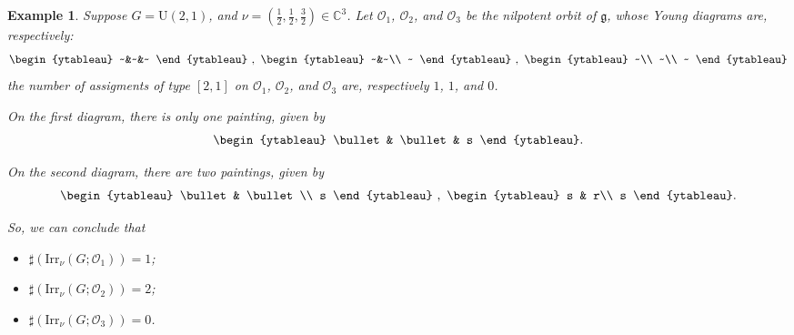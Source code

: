 \documentclass[12pt, a4paper]{amsart}
\numberwithin{equation}{section}
\newtheorem{examp}[thm]{Example}
\newcommand{\BC}{{\mathbb {C}}}
\newcommand{\CO}{{\mathcal {O}}}
\newcommand{\fg}{\mathfrak{g}}
\newcommand{\U}{{\mathrm{U}}}
\newcommand{\Irr}{{\mathrm{Irr}}}
\begin{document}
\begin{examp}
    Suppose $G = \U(2,1)$, and $\nu = (\frac{1}{2},\frac{1}{2},\frac{3}{2}) \in \BC^3$. Let $\CO_1$, $\CO_2$, and $\CO_3$ be the nilpotent orbit of $\fg$, whose Young diagrams are, respectively:
            \[
                \begin{ytableau}
                    ~&~&~
                \end{ytableau}
            ~,~
                \begin{ytableau}
                    ~&~\\
                    ~
                \end{ytableau}
            ~,~
                \begin{ytableau}
                    ~\\
                    ~\\
                    ~
                \end{ytableau}
            \]
            the number of assigments of type $[2,1]$ on $\CO_1$, $\CO_2$, and $\CO_3$ are, respectively $1$, $1$, and $0$.

            On the first diagram, there is only one painting, given by
            \[
                \begin{ytableau}
                    \bullet & \bullet & s
                \end{ytableau}.
            \]

            On the second diagram, there are two paintings, given by
            \[
            \begin{ytableau}
                \bullet & \bullet\\
                s    
            \end{ytableau}
            ~,~
            \begin{ytableau}
                s & r\\
                s
            \end{ytableau}.
            \]
            
            So, we can conclude that 
            \begin{itemize}
                \item $\sharp(\Irr_{\nu}(G;\CO_{1})) = 1$;
                \item $\sharp(\Irr_{\nu}(G;\CO_{2})) = 2$;
                \item $\sharp(\Irr_{\nu}(G;\CO_{3})) = 0$.
            \end{itemize}
\end{examp}
\end{document}
